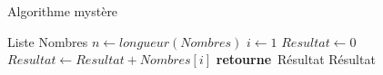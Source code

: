 \documentclass{beamer}
\newcommand{\algorithmicreturn}{\textbf{retourne}}
\newcommand{\RETURN}{\STATE \algorithmicreturn \ }
\begin{document}
\begin{frame}{Algorithme mystère}{}

	\begin{algorithmic}[1]
		\REQUIRE Liste Nombres
		\STATE $n \gets longueur(Nombres)$
		\STATE $i \gets 1$
		\STATE $Resultat \gets 0$
		\STATE $Resultat \gets Resultat + Nombres[i]$
		\ENDFOR
		\RETURN Résultat
		\ENSURE Résultat
	\end{algorithmic}


\end{frame}
\end{document}
